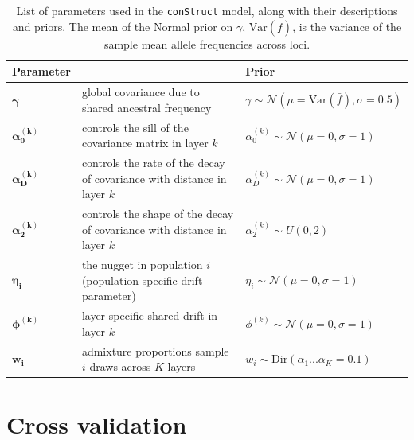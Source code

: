 \documentclass[10pt,letterpaper]{article}
\begin{document}
\begin{centering}
\begin{table}
\begin{tabular}{| >{\centering\arraybackslash}m{2.1cm} | m{5.2cm} | >{\centering\arraybackslash}m{5.1cm} |}
	\hline
	\textbf{Parameter} & \centering{\textbf{Description}} & \textbf{Prior}\\ \hline
	$\boldsymbol{\gamma}$ & 
		global covariance due to shared ancestral frequency & 
		$\gamma \sim \mathcal{N}(\mu = \text{Var}(\bar{f}), \sigma = 0.5)$\\ \hline
	$\boldsymbol{\alpha^{(k)}_0}$ & 
		controls the sill of the covariance matrix in layer $k$& 
		$\alpha^{(k)}_0 \sim \mathcal{N}(\mu = 0, \sigma = 1)$\\ \hline
	$\boldsymbol{\alpha^{(k)}_D}$ & 
		controls the rate of the decay of covariance with distance in layer $k$& 
		$\alpha^{(k)}_D \sim \mathcal{N}(\mu = 0, \sigma = 1)$\\ \hline
	$\boldsymbol{\alpha^{(k)}_2}$ & 
		controls the shape of the decay of covariance with distance in layer $k$ & 
		$\alpha^{(k)}_2 \sim U(0,2)$\\ \hline
	$\boldsymbol{\eta_i}$ & 
		the nugget in population $i$ (population specific drift parameter)  & 
		$\eta_i \sim \mathcal{N}(\mu = 0, \sigma = 1)$\\ \hline
	$\boldsymbol{\phi^{(k)}}$ & 
		layer-specific shared drift in layer $k$ &
		 $\phi^{(k)} \sim \mathcal{N}(\mu = 0, \sigma = 1)$\\ \hline
	$\boldsymbol{w_i}$ &
		admixture proportions sample $i$ draws across $K$ layers &
		$w_i \sim \text{Dir}(\alpha_{1} ... \alpha_{K}=0.1)$  \\ \hline
	\hline
\end{tabular}
\caption{
List of parameters used in the \texttt{conStruct} model, along with their descriptions and priors.
The mean of the Normal prior on $\gamma$, $\text{Var}(\bar{f})$, is the variance of the sample mean allele frequencies across loci.
}\label{tab:param_prior_tab}
\end{table}
\end{centering}

\section*{Cross validation}\label{Xvalidation}
\end{document}
